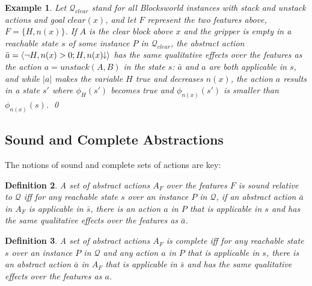 \documentclass[letterpaper]{article} %
\newcommand{\Omit}[1]{}
\newcommand{\tup}[1]{\langle #1 \rangle}
\newcommand{\abs}[1]{\ensuremath{\left\vert{#1}\right\vert}}
\newtheorem{definition}{Definition}
\newtheorem{example}[definition]{Example}
\newcommand{\Q}{\mathcal{Q}}
\newcommand{\abst}[2]{\tup{#1;#2}}
\newcommand{\mminus}{\hspace{-.05em}\raisebox{.15ex}{\footnotesize$\downarrow$}}
\begin{document}
\begin{example}
Let $\Q_{clear}$ stand for  all  Blocksworld instances with stack and unstack actions and goal $clear(x)$,
and let $F$ represent the two features above,  $F=\{H,n(x)\}$.  If $A$ is the clear block above $x$
 and the gripper is empty in a reachable state $s$ of some instance $P$ in $\Q_{clear}$, 
the abstract action $\bar{a}=\abst{\neg H,n(x)>0}{H,n(x)\mminus}$ has the same qualitative
effects over the features as the action   $a=unstack(A,B)$ in the state $s$:
$\bar{a}$ and $a$  are both applicable in $s$, and while $\abs{a}$ makes the variable $H$ true and decreases
$n(x)$, the action $a$ results in a state $s'$ where $\phi_{H}(s')$ becomes true and $\phi_{n(x)}(s')$ is
smaller than $\phi_{n(x)}(s)$. \qed
\end{example}


\subsection{Sound and Complete Abstractions}

The notions  of sound and complete sets of actions are key:

\begin{definition}
A set of abstract actions $A_F$ over the features $F$ is \emph{sound} relative to 
$\Q$ iff for any reachable state $s$ over an   instance $P$ in $\Q$,
if an abstract action $\bar{a}$ in $A_F$ is applicable in $\bar{s}$,
there is an  action $a$ in $P$ that is applicable in $s$ and
has the \emph{same qualitative effects} over the features as $\bar{a}$.
\end{definition}

\begin{definition}
A set of abstract actions $A_F$ is \emph{complete} iff for any
reachable state $s$ over an instance $P$ in $\Q$ and any  action $a$
in $P$ that is applicable in $s$, there is an abstract action $\bar{a}$ in
$A_F$ that is applicable in $\bar{s}$ and  has the \emph{same qualitative
effects over the features as $a$.}
\end{definition}

\Omit{
If we say that  action $a$ of an  instance $P$ in $\Q$   \emph{represents} or \emph{instantiates}
an abstract action $\bar{a}$ in a state $s$ of $P$ when $a$ and $\bar{a}$ are both applicable in $s$
and have  the \emph{same qualitative effects} over the features, then soundness means that an   applicable abstract action
can always be instantiated by
a  concrete action, while completeness  means that
an applicable concrete actions  is always the instantiation of an abstract action.
}
\end{document}
